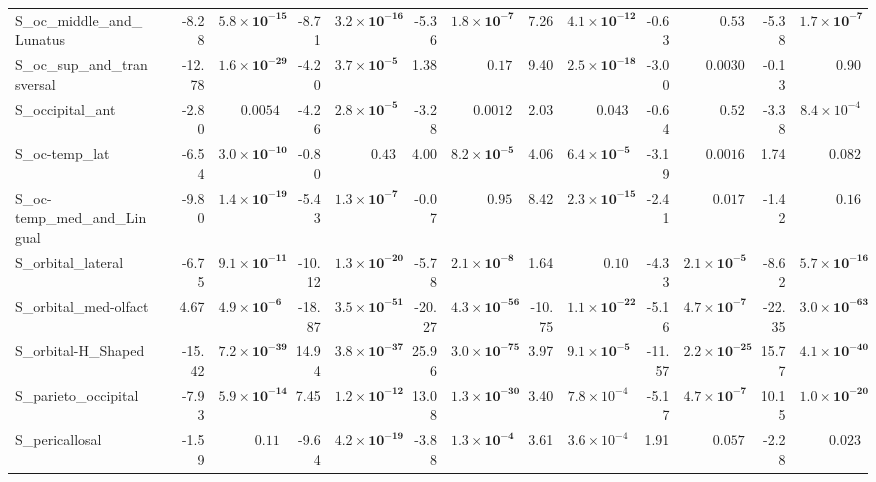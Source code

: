 {\begin{longtable}{llrrrrrrrrrrrr}
S\_oc\_middle\_and\_Lunatus &  & -8.28 & $\mathbf{5.8{\times}10^{-15}}$ & -8.71 & $\mathbf{3.2{\times}10^{-16}}$ & -5.36 & $\mathbf{1.8{\times}10^{-7}}$ & 7.26 & $\mathbf{4.1{\times}10^{-12}}$ & -0.63 & $0.53$ & -5.38 & $\mathbf{1.7{\times}10^{-7}}$ \\
S\_oc\_sup\_and\_transversal &  & -12.78 & $\mathbf{1.6{\times}10^{-29}}$ & -4.20 & $\mathbf{3.7{\times}10^{-5}}$ & 1.38 & $0.17$ & 9.40 & $\mathbf{2.5{\times}10^{-18}}$ & -3.00 & $0.0030$ & -0.13 & $0.90$ \\
S\_occipital\_ant &  & -2.80 & $0.0054$ & -4.26 & $\mathbf{2.8{\times}10^{-5}}$ & -3.28 & $0.0012$ & 2.03 & $0.043$ & -0.64 & $0.52$ & -3.38 & $8.4{\times}10^{-4}$ \\
S\_oc-temp\_lat &  & -6.54 & $\mathbf{3.0{\times}10^{-10}}$ & -0.80 & $0.43$ & 4.00 & $\mathbf{8.2{\times}10^{-5}}$ & 4.06 & $\mathbf{6.4{\times}10^{-5}}$ & -3.19 & $0.0016$ & 1.74 & $0.082$ \\
S\_oc-temp\_med\_and\_Lingual &  & -9.80 & $\mathbf{1.4{\times}10^{-19}}$ & -5.43 & $\mathbf{1.3{\times}10^{-7}}$ & -0.07 & $0.95$ & 8.42 & $\mathbf{2.3{\times}10^{-15}}$ & -2.41 & $0.017$ & -1.42 & $0.16$ \\
S\_orbital\_lateral &  & -6.75 & $\mathbf{9.1{\times}10^{-11}}$ & -10.12 & $\mathbf{1.3{\times}10^{-20}}$ & -5.78 & $\mathbf{2.1{\times}10^{-8}}$ & 1.64 & $0.10$ & -4.33 & $\mathbf{2.1{\times}10^{-5}}$ & -8.62 & $\mathbf{5.7{\times}10^{-16}}$ \\
S\_orbital\_med-olfact &  & 4.67 & $\mathbf{4.9{\times}10^{-6}}$ & -18.87 & $\mathbf{3.5{\times}10^{-51}}$ & -20.27 & $\mathbf{4.3{\times}10^{-56}}$ & -10.75 & $\mathbf{1.1{\times}10^{-22}}$ & -5.16 & $\mathbf{4.7{\times}10^{-7}}$ & -22.35 & $\mathbf{3.0{\times}10^{-63}}$ \\
S\_orbital-H\_Shaped &  & -15.42 & $\mathbf{7.2{\times}10^{-39}}$ & 14.94 & $\mathbf{3.8{\times}10^{-37}}$ & 25.96 & $\mathbf{3.0{\times}10^{-75}}$ & 3.97 & $\mathbf{9.1{\times}10^{-5}}$ & -11.57 & $\mathbf{2.2{\times}10^{-25}}$ & 15.77 & $\mathbf{4.1{\times}10^{-40}}$ \\
S\_parieto\_occipital &  & -7.93 & $\mathbf{5.9{\times}10^{-14}}$ & 7.45 & $\mathbf{1.2{\times}10^{-12}}$ & 13.08 & $\mathbf{1.3{\times}10^{-30}}$ & 3.40 & $7.8{\times}10^{-4}$ & -5.17 & $\mathbf{4.7{\times}10^{-7}}$ & 10.15 & $\mathbf{1.0{\times}10^{-20}}$ \\
S\_pericallosal &  & -1.59 & $0.11$ & -9.64 & $\mathbf{4.2{\times}10^{-19}}$ & -3.88 & $\mathbf{1.3{\times}10^{-4}}$ & 3.61 & $3.6{\times}10^{-4}$ & 1.91 & $0.057$ & -2.28 & $0.023$ \\

\end{longtable}}
